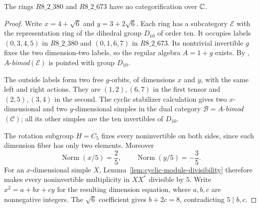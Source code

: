 \begin{proposition}\label{prop:r8-380-673-morita}
The rings $R8\_2\_380$ and $R8\_2\_673$ have no categorification
 over $\mathbb C$.
\end{proposition}
\begin{proof}
Write $x=4+\sqrt6$ and $y=3+2\sqrt6$. Each ring has a subcategory
$\mathcal E$ with the representation ring of the dihedral group
$D_{10}$ of order ten. It occupies labels $(0,3,4,5)$ in $R8\_2\_380$
and $(0,1,6,7)$ in $R8\_2\_673$. Its nontrivial invertible $g$ fixes
the two dimension-two labels, so the regular algebra $A=1+g$ exists.
By \cite[Lemma~6.2 and the proof of Theorem~6.3]{EGODimPQ},
$A$-\emph{bimod}$(\mathcal E)$ is pointed with group $D_{10}$.

The outside labels form two free $g$-orbits, of dimensions $x$ and
$y$, with the same left and right actions. They are $(1,2),(6,7)$
in the first tensor and $(2,5),(3,4)$ in the second. The cyclic
stabilizer calculation gives two $x$-dimensional and two
$y$-dimensional simples in the dual category
$\mathcal B=A$-\emph{bimod}$(\mathcal C)$; all its other simples
are the ten invertibles of $D_{10}$.

The rotation subgroup $H=C_5$ fixes every noninvertible on both
sides, since each dimension fiber has only two elements. Moreover
\[
 \operatorname{Norm}(x/5)=\frac25,\qquad
 \operatorname{Norm}(y/5)=-\frac35.
\]
For an $x$-dimensional simple $X$, Lemma~\ref{lem:cyclic-module-divisibility}
therefore makes every noninvertible multiplicity in $XX^*$ divisible
by $5$. Write $x^2=a+bx+cy$ for the resulting dimension equation,
where $a,b,c$ are nonnegative integers. The $\sqrt6$ coefficient gives
$b+2c=8$, contradicting $5\mid b,c$.
\end{proof}


